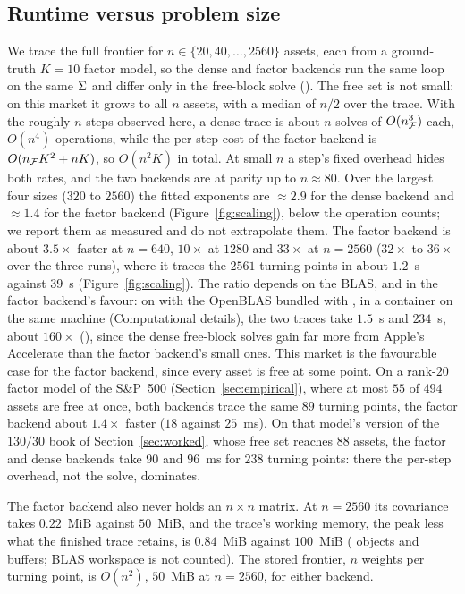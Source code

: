 \subsection{Runtime versus problem size}
\label{sec:scaling}

We trace the full frontier for $n \in \{20, 40, \dots, 2560\}$ assets, each from a
ground-truth $K = 10$ factor model, so the dense and factor backends run the same loop
on the same $\Sigma$ and differ only in the free-block solve (). The free
set is not small: on this market it grows to all $n$ assets, with a median of $n/2$ over
the trace. With the roughly $n$ steps observed here, a dense trace is about $n$ solves
of $O(n_{\mathcal{F}}^3)$ each, $O(n^4)$ operations, while the per-step cost of the factor backend is $O(n_{\mathcal{F}} K^2 + nK)$, so
$O(n^2 K)$ in total. At small $n$ a step's fixed overhead hides both rates, and the two backends are at
parity up to $n\approx 80$. Over the largest four sizes ($320$ to $2560$) the fitted
exponents are $\approx 2.9$ for the dense backend and $\approx 1.4$ for the factor
backend (Figure~\ref{fig:scaling}), below the operation counts; we report them as
measured and do not extrapolate them. The factor backend is about $3.5\times$ faster at
$n=640$, $10\times$ at $1280$ and $33\times$ at $n=2560$ ($32\times$ to $36\times$ over
the three runs), where it traces the $2561$ turning points in about $1.2$~s against $39$~s
(Figure~\ref{fig:scaling}). The ratio depends on the BLAS, and in the factor backend's
favour: on  with the OpenBLAS bundled with , in a container on
the same machine (Computational details), the two traces take $1.5$~s and $234$~s, about
$160\times$ (), since the dense free-block solves gain far more
from Apple's Accelerate than the factor backend's small ones. This market is the favourable case for the factor backend,
since every asset is free at some point. On a rank-$20$ factor model of the S\&P~500
(Section~\ref{sec:empirical}), where at most $55$ of $494$ assets are free at once, both
backends trace the same $89$ turning points, the factor backend about $1.4\times$ faster
($18$ against $25$~ms). On that model's version of the $130/30$ book of
Section~\ref{sec:worked}, whose free set reaches $88$ assets, the factor and dense backends take $90$ and
$96$~ms for $238$ turning points: there the per-step overhead, not the solve,
dominates.

The factor backend also never holds an $n\times n$ matrix. At $n=2560$ its covariance
takes $0.22$~MiB against $50$~MiB, and the trace's working memory, the
 peak less what the finished trace retains, is $0.84$~MiB against
$100$~MiB ( objects and  buffers; BLAS workspace is not counted). The stored frontier, $n$ weights per turning
point, is $O(n^2)$, $50$~MiB at $n=2560$, for either backend.

